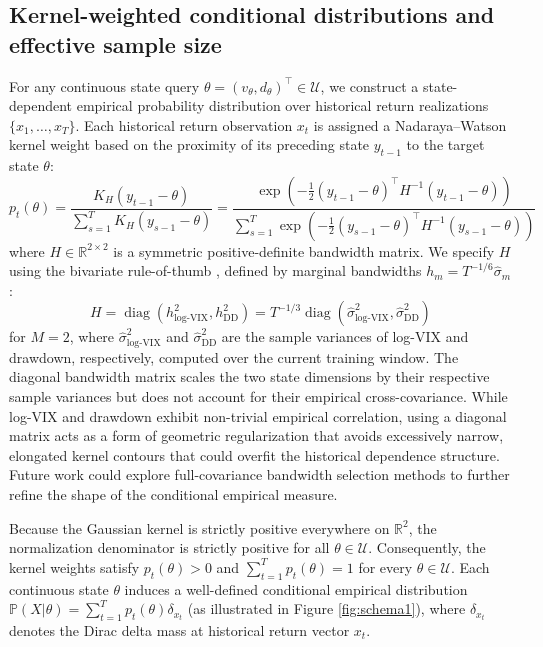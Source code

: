 \documentclass[smallcondensed]{svjour3}
\begin{document}
\subsection{Kernel-weighted conditional distributions and effective sample size}
For any continuous state query $\theta = (v_\theta, d_\theta)^\top \in \mathcal{U}$, we construct a state-dependent empirical probability distribution over historical return realizations $\{x_1, \dots, x_T\}$. Each historical return observation $x_t$ is assigned a Nadaraya--Watson kernel weight \cite{nadaraya1964estimating, watson1964smooth} based on the proximity of its preceding state $y_{t-1}$ to the target state $\theta$:
\begin{equation}
    p_t(\theta) = \frac{K_H(y_{t-1} - \theta)}{\sum_{s=1}^{T} K_H(y_{s-1} - \theta)} = \frac{\exp\left(-\frac{1}{2}(y_{t-1} - \theta)^\top H^{-1} (y_{t-1} - \theta)\right)}{\sum_{s=1}^T \exp\left(-\frac{1}{2}(y_{s-1} - \theta)^\top H^{-1} (y_{s-1} - \theta)\right)}
\end{equation}
where $H \in \mathbb{R}^{2 \times 2}$ is a symmetric positive-definite bandwidth matrix. We specify $H$ using the bivariate rule-of-thumb \cite{silverman1986density}, defined by marginal bandwidths $h_m = T^{-1/6}\hat\sigma_m$:
\begin{equation}
    H = \operatorname{diag}\left(h_{\text{log-VIX}}^2, h_{\text{DD}}^2\right) = T^{-1/3} \operatorname{diag}\left(\hat{\sigma}_{\text{log-VIX}}^2, \hat{\sigma}_{\text{DD}}^2\right)
\end{equation}
for $M = 2$, where $\hat{\sigma}^2_{\log\text{-VIX}}$ and $\hat{\sigma}^2_{\text{DD}}$ are the sample variances of log-VIX and drawdown, respectively, computed over the current training window. The diagonal bandwidth matrix scales the two state dimensions by their respective sample variances but does not account for their empirical cross-covariance. While log-VIX and drawdown exhibit non-trivial empirical correlation, using a diagonal matrix acts as a form of geometric regularization that avoids excessively narrow, elongated kernel contours that could overfit the historical dependence structure. Future work could explore full-covariance bandwidth selection methods to further refine the shape of the conditional empirical measure.

Because the Gaussian kernel is strictly positive everywhere on $\mathbb{R}^2$, the normalization denominator is strictly positive for all $\theta \in \mathcal{U}$. Consequently, the kernel weights satisfy $p_t(\theta) > 0$ and $\sum_{t=1}^T p_t(\theta) = 1$ for every $\theta \in \mathcal{U}$. Each continuous state $\theta$ induces a well-defined conditional empirical distribution $\mathbb{P}(X | \theta) = \sum_{t=1}^{T} p_t(\theta) \delta_{x_t}$ (as illustrated in Figure \ref{fig:schema1}), where $\delta_{x_t}$ denotes the Dirac delta mass at historical return vector $x_t$.
\end{document}

